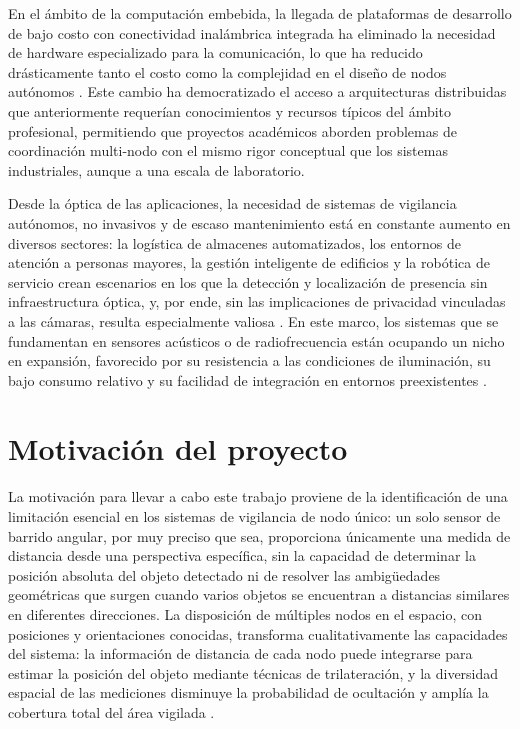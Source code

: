 En el ámbito de la computación embebida, la llegada de plataformas de desarrollo de bajo costo con conectividad inalámbrica integrada ha eliminado la necesidad de hardware especializado para la comunicación, lo que ha reducido drásticamente tanto el costo como la complejidad en el diseño de nodos autónomos \cite{2,14}. Este cambio ha democratizado el acceso a arquitecturas distribuidas que anteriormente requerían conocimientos y recursos típicos del ámbito profesional, permitiendo que proyectos académicos aborden problemas de coordinación multi-nodo con el mismo rigor conceptual que los sistemas industriales, aunque a una escala de laboratorio.

Desde la óptica de las aplicaciones, la necesidad de sistemas de vigilancia autónomos, no invasivos y de escaso mantenimiento está en constante aumento en diversos sectores: la logística de almacenes automatizados, los entornos de atención a personas mayores, la gestión inteligente de edificios y la robótica de servicio crean escenarios en los que la detección y localización de presencia sin infraestructura óptica, y, por ende, sin las implicaciones de privacidad vinculadas a las cámaras, resulta especialmente valiosa \cite{3,4}. En este marco, los sistemas que se fundamentan en sensores acústicos o de radiofrecuencia están ocupando un nicho en expansión, favorecido por su resistencia a las condiciones de iluminación, su bajo consumo relativo y su facilidad de integración en entornos preexistentes \cite{19,20}.

\section{Motivación del proyecto}

La motivación para llevar a cabo este trabajo proviene de la identificación de una limitación esencial en los sistemas de vigilancia de nodo único: un solo sensor de barrido angular, por muy preciso que sea, proporciona únicamente una medida de distancia desde una perspectiva específica, sin la capacidad de determinar la posición absoluta del objeto detectado ni de resolver las ambigüedades geométricas que surgen cuando varios objetos se encuentran a distancias similares en diferentes direcciones. La disposición de múltiples nodos en el espacio, con posiciones y orientaciones conocidas, transforma cualitativamente las capacidades del sistema: la información de distancia de cada nodo puede integrarse para estimar la posición del objeto mediante técnicas de trilateración, y la diversidad espacial de las mediciones disminuye la probabilidad de ocultación y amplía la cobertura total del área vigilada \cite{19,21}.

